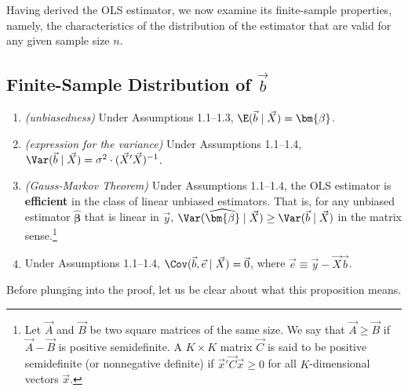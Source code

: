 
Having derived the OLS estimator, we now examine its finite-sample properties,
namely, the characteristics of the distribution of the estimator that are valid for any
given sample size $n$.

\subsection*{Finite-Sample Distribution of \texorpdfstring{$\vec{b}$}{b}}

\begin{proposition}
\label{prop:1.1}
\begin{enumerate}[label=(\alph*)]
  \item \emph{(unbiasedness)} Under Assumptions 1.1--1.3,
    $\E(\vec{b} \mid \vec{X}) = \bm{\beta}$.

  \item \emph{(expression for the variance)} Under Assumptions 1.1--1.4,
    $\Var(\vec{b} \mid \vec{X}) = \sigma^{2} \cdot (\vec{X}'\vec{X})^{-1}$.

  \item \emph{(Gauss-Markov Theorem)} Under Assumptions 1.1--1.4, the OLS estimator is
    \textbf{efficient} in the class of linear unbiased estimators.  That is, for any
    unbiased estimator $\widehat{\bm{\beta}}$ that is linear in $\vec{y}$,
    $\Var(\widehat{\bm{\beta}} \mid \vec{X}) \geq \Var(\vec{b} \mid \vec{X})$
    in the matrix sense.\footnote{Let $\vec{A}$ and $\vec{B}$ be two square matrices
    of the same size.  We say that $\vec{A} \geq \vec{B}$ if $\vec{A} - \vec{B}$ is
    positive semidefinite.  A $K \times K$ matrix $\vec{C}$ is said to be positive
    semidefinite (or nonnegative definite) if $\vec{x}'\vec{C}\vec{x} \geq 0$ for all
    $K$-dimensional vectors $\vec{x}$.}

  \item Under Assumptions 1.1--1.4,
    $\Cov(\vec{b}, \vec{e} \mid \vec{X}) = \vec{0}$, where
    $\vec{e} \equiv \vec{y} - \vec{X}\vec{b}$.
\end{enumerate}
\end{proposition}

Before plunging into the proof, let us be clear about what this proposition means.

